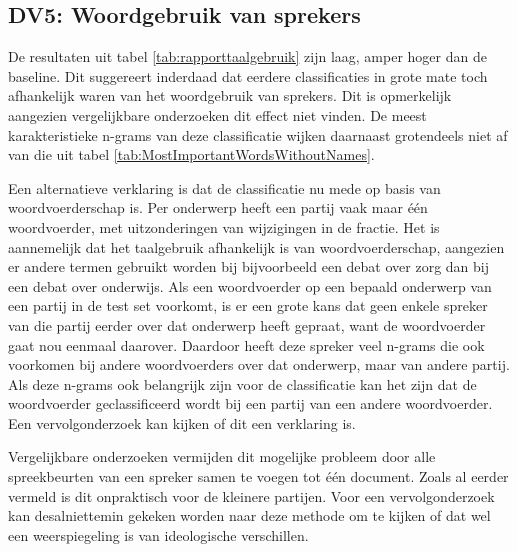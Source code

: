 \subsection{DV5: Woordgebruik van sprekers}
De resultaten uit tabel \ref{tab:rapporttaalgebruik} zijn laag, amper hoger dan de baseline. Dit suggereert inderdaad dat eerdere classificaties in grote mate toch afhankelijk waren van het woordgebruik van sprekers. Dit is opmerkelijk aangezien vergelijkbare onderzoeken dit effect niet vinden. De meest karakteristieke n-grams van deze classificatie wijken daarnaast grotendeels niet af van die uit tabel \ref{tab:MostImportantWordsWithoutNames}.\par
Een alternatieve verklaring is dat de classificatie nu mede op basis van woordvoerderschap is. Per onderwerp heeft een partij vaak maar één woordvoerder, met uitzonderingen van wijzigingen in de fractie. Het is aannemelijk dat het taalgebruik afhankelijk is van woordvoerderschap, aangezien er andere termen gebruikt worden bij bijvoorbeeld een debat over zorg dan bij een debat over onderwijs. Als een woordvoerder op een bepaald onderwerp van een partij in de test set voorkomt, is er een grote kans dat geen enkele spreker van die partij eerder over dat onderwerp heeft gepraat, want de woordvoerder gaat nou eenmaal daarover. Daardoor heeft deze spreker veel n-grams die ook voorkomen bij andere woordvoerders over dat onderwerp, maar van andere partij. Als deze n-grams ook belangrijk zijn voor de classificatie kan het zijn dat de woordvoerder geclassificeerd wordt bij een partij van een andere woordvoerder. Een vervolgonderzoek kan kijken of dit een verklaring is.\par
Vergelijkbare onderzoeken vermijden dit mogelijke probleem door alle spreekbeurten van een spreker samen te voegen tot één document. Zoals al eerder vermeld is dit onpraktisch voor de kleinere partijen. Voor een vervolgonderzoek kan desalniettemin gekeken worden naar deze methode om te kijken of dat wel een weerspiegeling is van ideologische verschillen.\par


